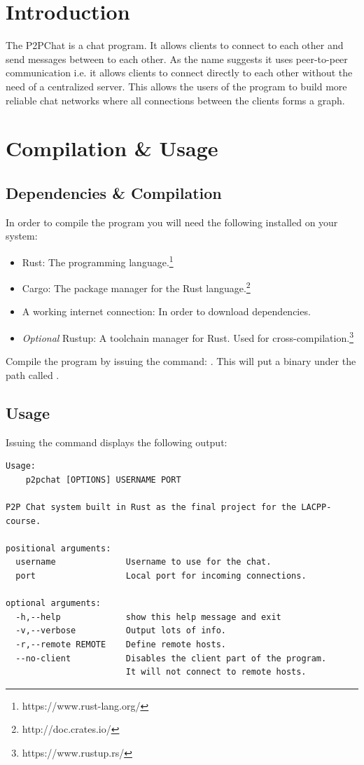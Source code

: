 \section{Introduction}
The P2PChat is a chat program. It allows clients to connect to each other and send messages between to each other. As the name suggests it uses peer-to-peer communication i.e. it allows clients to connect directly to each other without the need of a centralized server. This allows the users of the program to build more reliable chat networks where all connections between the clients forms a graph.

\section{Compilation \& Usage}
\subsection{Dependencies \& Compilation}
In order to compile the program you will need the following installed on your system:
\begin{itemize}
  \item Rust: The programming language.\footnote{https://www.rust-lang.org/}
  \item Cargo: The package manager for the Rust language.\footnote{http://doc.crates.io/}
  \item A working internet connection: In order to download dependencies.
  \item \textit{Optional} Rustup: A toolchain manager for Rust. Used for cross-compilation.\footnote{https://www.rustup.rs/}
\end{itemize}

\noindent Compile the program by issuing the command: . This will put a binary under the path  called .

\subsection{Usage}
Issuing the command  displays the following output:
\begin{lstlisting}
Usage:
    p2pchat [OPTIONS] USERNAME PORT

P2P Chat system built in Rust as the final project for the LACPP-course.

positional arguments:
  username              Username to use for the chat.
  port                  Local port for incoming connections.

optional arguments:
  -h,--help             show this help message and exit
  -v,--verbose          Output lots of info.
  -r,--remote REMOTE    Define remote hosts.
  --no-client           Disables the client part of the program.
                        It will not connect to remote hosts.
\end{lstlisting}

